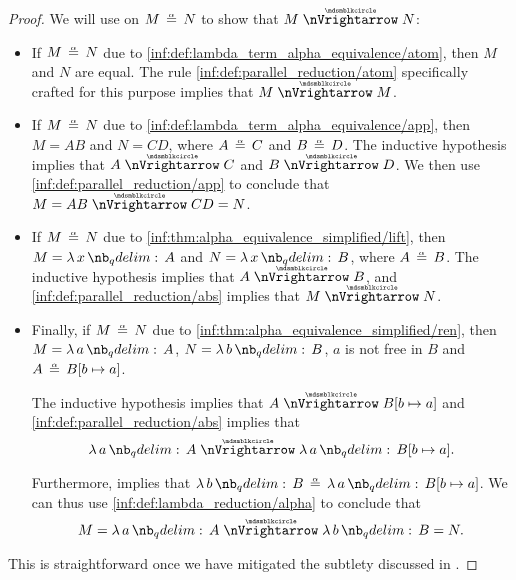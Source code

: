 \begin{proof}
   We will use  on \( M \aequiv N \) to show that \( M \ppred N \):
  \begin{itemize}
    \item If \( M \aequiv N \) due to \ref{inf:def:lambda_term_alpha_equivalence/atom}, then \( M \) and \( N \) are equal. The rule \ref{inf:def:parallel_reduction/atom} specifically crafted for this purpose implies that \( M \ppred M \).

    \item If \( M \aequiv N \) due to \ref{inf:def:lambda_term_alpha_equivalence/app}, then \( M = AB \) and \( N = CD \), where \( A \aequiv C \) and \( B \aequiv D \). The inductive hypothesis implies that \( A \ppred C \) and \( B \ppred D \). We then use \ref{inf:def:parallel_reduction/app} to conclude that \( M = AB \ppred CD = N \).

    \item If \( M \aequiv N \) due to \ref{inf:thm:alpha_equivalence_simplified/lift}, then \( M = \qabs x A \) and \( N = \qabs x B \), where \( A \aequiv B \). The inductive hypothesis implies that \( A \ppred B \), and \ref{inf:def:parallel_reduction/abs} implies that \( M \ppred N \).

    \item Finally, if \( M \aequiv N \) due to \ref{inf:thm:alpha_equivalence_simplified/ren}, then \( M = \qabs a A \), \( N = \qabs b B \), \( a \) is not free in \( B \) and \( A \aequiv B[b \mapsto a] \).

    The inductive hypothesis implies that \( A \ppred B[b \mapsto a] \) and \ref{inf:def:parallel_reduction/abs} implies that
    \begin{equation*}
      \qabs a A \ppred \qabs a B[b \mapsto a].
    \end{equation*}

    Furthermore,  implies that \( \qabs b B \aequiv \qabs a B[b \mapsto a] \). We can thus use \ref{inf:def:lambda_reduction/alpha} to conclude that
    \begin{equation*}
      M = \qabs a A \ppred \qabs b B = N.
    \end{equation*}
  \end{itemize}

   This is straightforward once we have mitigated the subtlety discussed in .


\end{proof}
